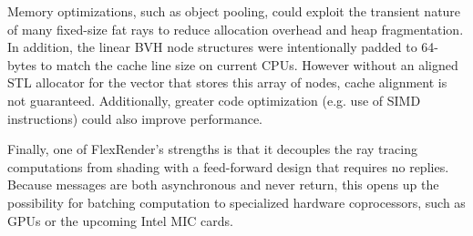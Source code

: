 \documentclass[a4paper,twoside]{article}
\begin{document}
Memory optimizations, such as object pooling, could exploit the transient nature
of many fixed-size fat rays to reduce allocation overhead and heap fragmentation.
In addition, the linear BVH node structures were intentionally padded to
64-bytes to match the cache line size on current CPUs. However without an aligned
STL allocator for the vector that stores this array of nodes, cache alignment
is not guaranteed. Additionally, greater code optimization (e.g. use of SIMD
instructions) could also improve performance.

Finally, one of FlexRender's strengths is that it decouples the ray tracing
computations from shading with a feed-forward design that requires no replies.
Because messages are both asynchronous and never return, this opens up the
possibility for batching computation to specialized hardware coprocessors, such
as GPUs or the upcoming Intel MIC cards.


{\small
}

\vfill
\end{document}

